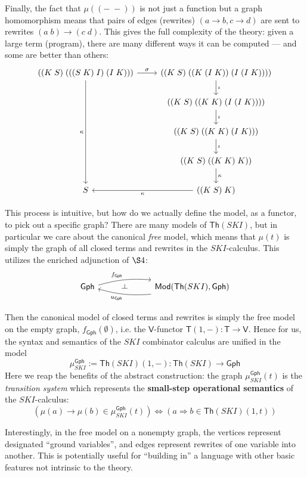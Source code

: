 \documentclass{amsart}
\theoremstyle{definition}
\def\ld{\rotatebox[origin=c]{-90}{$\dashv$}} %
\newcommand{\Th}{\mathsf{Th}}
\newcommand{\Gph}{\mathsf{Gph}}
\newcommand{\Mod}{\mathsf{Mod}}
\newcommand{\V}{\mathsf{V}}
\newcommand{\T}{\mathsf{T}}
\newcommand{\maps}{\colon}
\begin{document}
Finally, the fact that $\mu((-\;-))$ is not just a function but a graph homomorphism means that pairs of edges (rewrites) $(a\to b, c\to d)$ are sent to rewrites $(a\; b) \to (c\; d)$. This gives the full complexity of the theory: given a large term (program), there are many different ways it can be computed --- and some are better than others:
\[\begin{tikzcd}
	((K\; S)\; (((S\; K)\; I)\; (I\; K))) \arrow[r,"\sigma"] \arrow[dddd,swap,"\kappa"] & ((K\; S)\; ((K\;(I\; K))\; (I\; (I\; K)))) \arrow[d,"\iota"]\\
	& ((K\; S)\; ((K\; K)\; (I\; (I\; K)))) \arrow[d,"\iota"]\\
	& ((K\; S)\; ((K\; K)\; (I\; K))) \arrow[d,"\iota"]\\
	& ((K\; S)\; ((K\; K)\; K)) \arrow[d,"\kappa"]\\
	S & ((K\; S)\; K)\arrow[l,"\kappa"]
\end{tikzcd}\]

This process is intuitive, but how do we actually define the model, as a functor, to pick out a specific graph? There are many models of $\Th(SKI)$, but in particular we care about the canonical \textit{free} model, which means that $\mu(t)$ is simply the graph of all closed terms and rewrites in the $SKI$-calculus. This utilizes the enriched adjunction of $\S4$:
\[\begin{tikzcd}
\Gph \arrow[bend left=10,"f_\Gph"]{rr}
& \ld &
\arrow[bend left=10,"u_\Gph"]{ll} \Mod(\Th(SKI),\Gph)
\end{tikzcd}\]

Then the canonical model of closed terms and rewrites is simply the free model on the empty graph, $f_\Gph(\emptyset)$, i.e. the $\V$-functor $\T(1,-)\maps\T\to \V$. Hence for us, the syntax and semantics of the $SKI$ combinator calculus are unified in the model $$\mu_{SKI}^\Gph:= \Th(SKI)(1,-)\maps \Th(SKI) \to \Gph$$ Here we reap the benefits of the abstract construction: the graph $\mu_{SKI}^\Gph(t)$ is the \textit{transition system} which represents the \textbf{small-step operational semantics} of the $SKI$-calculus: $$(\mu(a) \to \mu(b) \in \mu_{SKI}^\Gph(t)) \iff (a \Rightarrow b \in \Th(SKI)(1,t))$$

Interestingly, in the free model on a nonempty graph, the vertices represent designated ``ground variables'', and edges represent rewrites of one variable into another. This is potentially useful for ``building in'' a language with other basic features not intrinsic to the theory.
\end{document}
